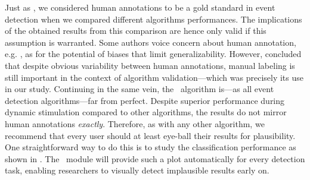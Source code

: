 Just as \cite{Andersson2017}, we considered human annotations to be a gold
standard in event detection when we compared different algorithms performances.
The implications of the obtained results from this comparison are hence only
valid if this assumption is warranted. Some authors voice concern about human
annotation, e.g. \cite{5523936}, as for the potential of biases that limit
generalizability. However, \cite{Hooge2018} concluded that despite obvious
variability between human annotations, manual labeling is still important in the context of algorithm validation---which was precisely its use in our study. Continuing in
the same vein, the \remodnav\ algorithm is---as all event detection algorithms---far from perfect. Despite superior performance during dynamic stimulation
compared to other algorithms, the results do not mirror human annotations
\textit{exactly}. Therefore, as with any other algorithm, we recommend that every user
should at least eye-ball their results for plausibility. One straightforward
way to do this is to study the classification performance as shown in
. The \remodnav\ module will provide such a plot automatically
for every detection task, enabling researchers to visually detect implausible results
early on.





